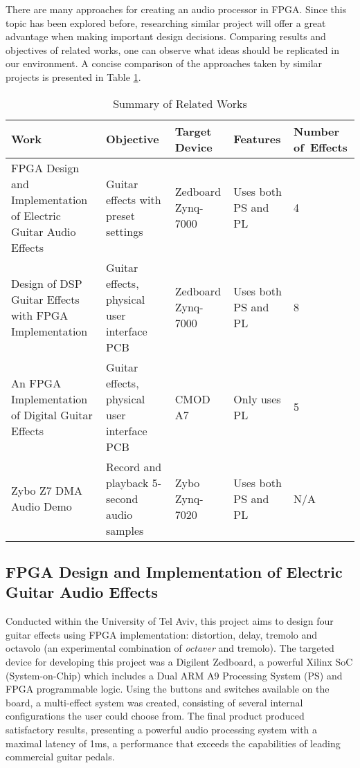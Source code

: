 There are many approaches for creating an audio processor in FPGA. Since this topic has been explored before, researching similar project will offer a great advantage when making important design decisions. Comparing results and objectives of related works, one can observe what ideas should be replicated in our environment. A concise comparison of the approaches taken by similar projects is presented in Table \ref{tab:related-works}.

\begin{table}[h]
    \centering
    \begin{tabular}{|p{5.5cm}|p{4cm}|p{2cm}|p{1.8cm}|p{1.5cm}|}
        \hline
        \textbf{Work} & \textbf{Objective} & \textbf{Target Device} & \textbf{Features} & \textbf{Number \mbox{of Effects}} \\
        \hline
        FPGA Design and Implementation of Electric Guitar Audio Effects \cite{tel-aviv} & Guitar effects with preset settings & Zedboard Zynq-7000 & Uses both PS and PL & 4 \\
        \hline
        Design of DSP Guitar Effects with FPGA Implementation \cite{rochester} & Guitar effects, physical user interface PCB & Zedboard Zynq-7000 & Uses both PS and PL & 8 \\
        \hline
        An FPGA Implementation of \mbox{Digital} Guitar Effects \cite{california} & Guitar effects, physical user interface PCB & CMOD A7 & Only uses PL & 5 \\
        \hline
        Zybo Z7 DMA Audio Demo \cite{dma-demo} & Record and playback 5-second audio samples & Zybo Zynq-7020 & Uses both PS and PL & N/A \\
        \hline
    \end{tabular}
    \caption{Summary of Related Works}
    \label{tab:related-works}
\end{table}

\subsection[]{FPGA Design and Implementation of Electric Guitar Audio Effects\cite{tel-aviv}}

Conducted within the University of Tel Aviv, this project aims to design four guitar effects using FPGA implementation: distortion, delay, tremolo and octavolo (an experimental combination of \textit{octaver} and tremolo). The targeted device for developing this project was a Digilent Zedboard, a powerful Xilinx SoC (System-on-Chip) which includes a Dual ARM A9 Processing System (PS) and FPGA programmable logic. Using the buttons and switches available on the board, a multi-effect system was created, consisting of several internal configurations the user could choose from. The final product produced satisfactory results, presenting a powerful audio processing system with a maximal latency of 1ms, a performance that exceeds the capabilities of leading commercial guitar pedals.

